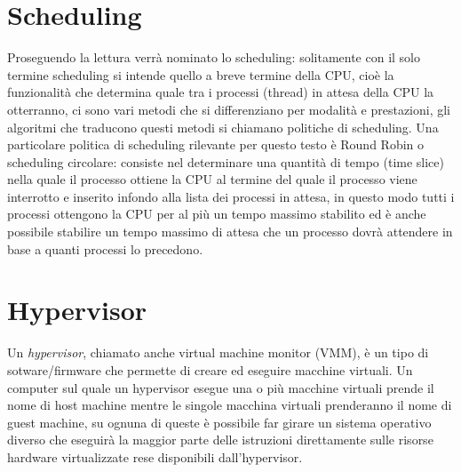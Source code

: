 \section{Scheduling}
Proseguendo la lettura verrà nominato lo scheduling: solitamente con il solo termine scheduling si intende quello a breve termine della CPU, cioè la funzionalità che determina quale tra i processi (thread) in attesa della CPU la otterranno, ci sono vari metodi che si differenziano per modalità e prestazioni, gli algoritmi che traducono questi metodi si chiamano politiche di scheduling.
Una particolare politica di scheduling rilevante per questo testo è Round Robin o scheduling circolare: consiste nel determinare una quantità di tempo (time slice) nella quale il processo ottiene la CPU al termine del quale il processo viene interrotto e inserito infondo alla lista dei processi in attesa, in questo modo tutti i processi ottengono la CPU per al più un tempo massimo stabilito ed è anche possibile stabilire un tempo massimo di attesa che un processo dovrà attendere in base a quanti processi lo precedono.

\section{Hypervisor}
Un \textit{hypervisor}, chiamato anche virtual machine monitor (VMM), è un tipo di sotware/firmware che permette di creare ed eseguire macchine virtuali. Un computer sul quale un hypervisor esegue una o più macchine virtuali prende il nome di host machine mentre le singole macchina virtuali prenderanno il nome di guest machine, su ognuna di queste è possibile far girare un sistema operativo diverso che eseguirà la maggior parte delle istruzioni direttamente sulle risorse hardware virtualizzate rese disponibili dall'hypervisor.